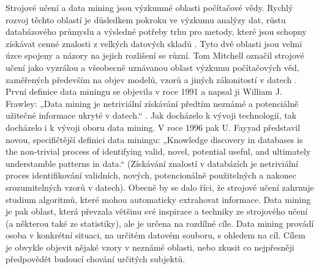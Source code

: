 \documentclass[12pt]{article}
\begin{document}
Strojové učení a data mining jsou výzkumné oblasti počítačové vědy. Rychlý rozvoj těchto oblastí je důsledkem pokroku ve výzkumu analýzy dat, růstu databázového průmyslu a výsledné potřeby trhu pro metody, které jsou schopny získávat cenné znalosti z velkých datových skladů \citep{furn}. Tyto dvě oblasti jsou velmi úzce spojeny a názory na jejich rozlišení se různí. Tom Mitchell označil strojové učení jako vyzrálou a všeobecně uznávanou oblast výzkumu počítačových věd, zaměřených především na objev modelů, vzorů a jiných zákonitostí v datech \citep{mitchell}. První definice data miningu se objevila v roce 1991 a napsal ji William J. Frawley: „Data mining je netriviální získávání předtím neznámé a potenciálně užitečné informace ukryté v datech.“ \citep{Nisbet_2009}. Jak docházelo k vývoji technologií, tak docházelo i k vývoji oboru data mining. V roce 1996 pak U. Fayyad představil novou, specifičtější definici data miningu: „Knowledge discovery in databases is the non-trivial process of identifying valid,
novel, potential useful, and ultimately understamble patterns in data.“ (Získávání
znalostí v databázích je netriviální proces identifikování validních, nových,
potencionálně použitelných a nakonec srozumitelných vzorů v datech). \citep{fayyad}
\newline 
\indent Obecně by se dalo říci, že strojové učení zahrnuje studium algoritmů, které mohou automaticky extrahovat informace. Data mining je pak oblast, která převzala většinu své inspirace a techniky ze strojového učení (a některou také ze statistiky), ale je určena na rozdílné cíle. 
Data mining provádí osoba v konkrétní situaci, na určitém datovém souboru, s ohledem na cíl. Cílem je obvykle objevit nějaké vzory v neznámé oblasti, nebo zkusit co nejpřesněji předpovědět budoucí chování určitých subjektů.
\end{document}
